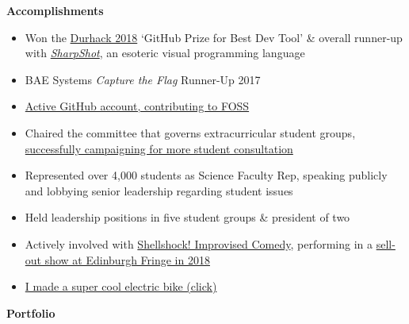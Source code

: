 \documentclass[hidelinks, 12pt, a4paper]{article}
\newcommand{\smitem}[1]{\item {\small {#1}}}
\newenvironment{bullets}{\begin{minipage}[t]{\linewidth}\begin{itemize}[leftmargin=2em,label=-,nosep]}{\end{itemize}\end{minipage}\vspace{2pt}}
\newcommand{\sectionheader}[1]{
	\vspace{6pt}
	{
		\noindent
		\hspace{3pt}
		\Large\textbf{#1}}}
\begin{document}
\begin{minipage}{0.58\textwidth}
		\sectionheader{Accomplishments}
		
		\vspace{4pt}
		
		\begin{bullets}
			\smitem{Won the \href{https://durhack.com}{Durhack 2018} `GitHub Prize for Best Dev Tool' \& overall runner-up with \href{https://github.com/motherlymuppet/sharpshot}{\emph{SharpShot}}, an esoteric visual programming language}
			\smitem{BAE Systems \emph{Capture the Flag} Runner-Up 2017}
			\smitem{\href{https://github.com/motherlymuppet}{Active GitHub account, contributing to FOSS}}
			
			\smitem{Chaired the committee that governs extracurricular student groups, \href{https://www.thebubble.org.uk/current-affairs/student-life/motion-voted-down-by-outraged-assembly/}{successfully campaigning for more student consultation}}
			\smitem{Represented over 4,000 students as Science Faculty Rep, speaking publicly and lobbying senior leadership regarding student issues}
			\smitem{Held leadership positions in five student groups \& president of two}
			
			\smitem{Actively involved with \href{http://community.dur.ac.uk/dur.improv/}{Shellshock! Improvised Comedy}, performing in a \href{https://tickets.edfringe.com/whats-on/here-be-improv}{sell-out show at Edinburgh Fringe in 2018}}
			\smitem{\href{https://i.imgur.com/4Uz2USm.jpg}{I made a super cool electric bike (click)}}
		\end{bullets}
	\end{minipage}
	
	\newpage
	
	\vspace*{12pt}
	
	\begin{center}
		\Huge \textbf{Portfolio}
	\end{center}
	
\end{document}
